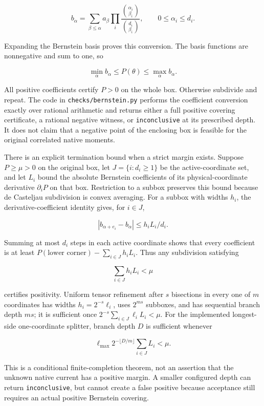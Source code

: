 \[
 b_\alpha=\sum_{\beta\le\alpha}a_\beta
 \prod_i\frac{\binom{\alpha_i}{\beta_i}}{\binom{d_i}{\beta_i}},
 \qquad0\le\alpha_i\le d_i.
\]

Expanding the Bernstein basis proves this conversion. The basis
functions are nonnegative and sum to one, so

\[
 \min_\alpha b_\alpha\le P(\theta)\le\max_\alpha b_\alpha.
\]

All positive coefficients certify \(P>0\) on the whole box. Otherwise
subdivide and repeat. The code in \texttt{checks/bernstein.py} performs
the coefficient conversion exactly over rational arithmetic and returns
either a full positive covering certificate, a rational negative
witness, or \texttt{inconclusive} at its prescribed depth. It does not
claim that a negative point of the enclosing box is feasible for the
original correlated native moments.

There is an explicit termination bound when a strict margin exists.
Suppose \(P\ge\mu>0\) on the original box, let \(J=\{i:d_i\ge1\}\) be
the active-coordinate set, and let \(L_i\) bound the absolute Bernstein
coefficients of its physical-coordinate derivative \(\partial_iP\) on
that box. Restriction to a subbox preserves this bound because de
Casteljau subdivision is convex averaging. For a subbox with widths
\(h_i\), the derivative-coefficient identity gives, for \(i\in J\),

\[
 |b_{\alpha+e_i}-b_\alpha|\le h_iL_i/d_i.
\]

Summing at most \(d_i\) steps in each active coordinate shows that every
coefficient is at least \(P(\text{lower corner})-\sum_{i\in J} h_iL_i\).
Thus any subdivision satisfying

\[
 \sum_{i\in J} h_iL_i<\mu
\]

certifies positivity. Uniform tensor refinement after \(s\) bisections
in every one of \(m\) coordinates has widths \(h_i=2^{-s}\ell_i\), uses
\(2^{ms}\) subboxes, and has sequential branch depth \(ms\); it is
sufficient once \(2^{-s}\sum_{i\in J}\ell_iL_i<\mu\). For the
implemented longest-side one-coordinate splitter, branch depth \(D\) is
sufficient whenever

\[
 \boxed{\ell_{\max}2^{-\lfloor D/m\rfloor}
 \sum_{i\in J}L_i<\mu.}
\]

This is a conditional finite-completion theorem, not an assertion that
the unknown native current has a positive margin. A smaller configured
depth can return \texttt{inconclusive}, but cannot create a false
positive because acceptance still requires an actual positive Bernstein
covering.

